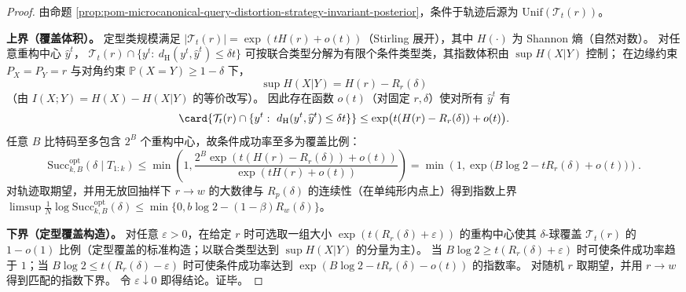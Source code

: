 \begin{proof}
由命题 \ref{prop:pom-microcanonical-query-distortion-strategy-invariant-posterior}，条件于轨迹后源为 \(\mathrm{Unif}(\mathcal{T}_t(r))\)。
\par
\textbf{上界（覆盖体积）。}
定型类规模满足 \(|\mathcal{T}_t(r)|=\exp(tH(r)+o(t))\)（Stirling 展开），其中 \(H(\cdot)\) 为 Shannon 熵（自然对数）。
对任意重构中心 \(\widehat y^t\)，
\(\mathcal{T}_t(r)\cap\{y^t:\ d_{\mathrm H}(y^t,\widehat y^t)\le \delta t\}\)
可按联合类型分解为有限个条件类型类，其指数体积由 \(\sup H(X|Y)\) 控制；
在边缘约束 \(P_X=P_Y=r\) 与对角约束 \(\mathbb{P}(X=Y)\ge 1-\delta\) 下，
\[
\sup H(X|Y)=H(r)-R_r(\delta)
\]
（由 \(I(X;Y)=H(X)-H(X|Y)\) 的等价改写）。
因此存在函数 \(o(t)\)（对固定 \(r,\delta\)）使对所有 \(\widehat y^t\) 有
\[
\card{\mathcal{T}_t(r)\cap\{y^t:\ d_{\mathrm H}(y^t,\widehat y^t)\le \delta t\}}
\le \exp\bigl(t(H(r)-R_r(\delta))+o(t)\bigr).
\]
任意 \(B\) 比特码至多包含 \(2^B\) 个重构中心，故条件成功率至多为覆盖比例：
\[
\mathrm{Succ}^{\mathrm{opt}}_{k,B}(\delta\mid T_{1:k})
\le
\min\!\left(1,\frac{2^B\exp(t(H(r)-R_r(\delta))+o(t))}{\exp(tH(r)+o(t))}\right)
=\min\!\left(1,\exp\bigl(B\log 2-tR_r(\delta)+o(t)\bigr)\right).
\]
对轨迹取期望，并用无放回抽样下 \(r\to w\) 的大数律与 \(R_p(\delta)\) 的连续性（在单纯形内点上）得到指数上界
\(\limsup \frac1N\log \mathrm{Succ}^{\mathrm{opt}}_{k,B}(\delta)\le \min\{0,b\log 2-(1-\beta)R_w(\delta)\}\)。
\par
\textbf{下界（定型覆盖构造）。}
对任意 \(\varepsilon>0\)，在给定 \(r\) 时可选取一组大小 \(\exp(t(R_r(\delta)+\varepsilon))\) 的重构中心使其 \(\delta\)-球覆盖 \(\mathcal{T}_t(r)\) 的 \(1-o(1)\) 比例（定型覆盖的标准构造；以联合类型达到 \(\sup H(X|Y)\) 的分量为主）。
当 \(B\log 2\ge t(R_r(\delta)+\varepsilon)\) 时可使条件成功率趋于 \(1\)；当 \(B\log 2\le t(R_r(\delta)-\varepsilon)\) 时可使条件成功率达到
\(\exp(B\log 2-tR_r(\delta)-o(t))\) 的指数率。
对随机 \(r\) 取期望，并用 \(r\to w\) 得到匹配的指数下界。
令 \(\varepsilon\downarrow 0\) 即得结论。证毕。
\end{proof}

